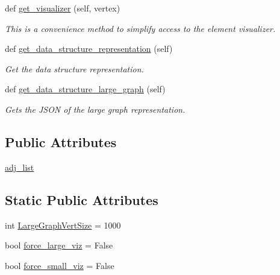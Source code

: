 \begin{DoxyCompactItemize}
def \hyperlink{classbridges_1_1graph__adj__list_1_1_graph_adj_list_ad63fce416ec0fdfd99d05e6236807fd8}{get\+\_\+visualizer} (self, vertex)
\begin{DoxyCompactList}\small\item\em This is a convenience method to simplify access to the element visualizer. \end{DoxyCompactList}\item 
def \hyperlink{classbridges_1_1graph__adj__list_1_1_graph_adj_list_a20ea8a6a1aa03a82223a59474037b3e3}{get\+\_\+data\+\_\+structure\+\_\+representation} (self)
\begin{DoxyCompactList}\small\item\em Get the data structure representation. \end{DoxyCompactList}\item 
def \hyperlink{classbridges_1_1graph__adj__list_1_1_graph_adj_list_aaffde74237de001232e0996a8c64ab82}{get\+\_\+data\+\_\+structure\+\_\+large\+\_\+graph} (self)
\begin{DoxyCompactList}\small\item\em Gets the J\+S\+ON of the large graph representation. \end{DoxyCompactList}\end{DoxyCompactItemize}
\subsection*{Public Attributes}
\begin{DoxyCompactItemize}
\item 
\hyperlink{classbridges_1_1graph__adj__list_1_1_graph_adj_list_ad39dbb3db39a3ffc145c372e6996443c}{adj\+\_\+list}
\end{DoxyCompactItemize}
\subsection*{Static Public Attributes}
\begin{DoxyCompactItemize}
\item 
int \hyperlink{classbridges_1_1graph__adj__list_1_1_graph_adj_list_a093a64ead793e0bd3b1ce4e3456665c9}{Large\+Graph\+Vert\+Size} = 1000
\item 
bool \hyperlink{classbridges_1_1graph__adj__list_1_1_graph_adj_list_aa9f4209af428473fd2d6952a74eb22b9}{force\+\_\+large\+\_\+viz} = False
\item 
bool \hyperlink{classbridges_1_1graph__adj__list_1_1_graph_adj_list_a27900e6bb5504036ccf5ec2e4d301ddb}{force\+\_\+small\+\_\+viz} = False
\end{DoxyCompactItemize}


